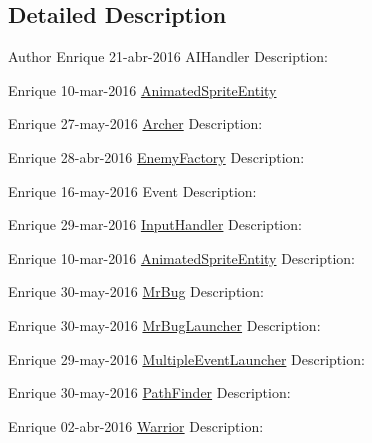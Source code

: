 \subsection{Detailed Description}
\begin{DoxyAuthor}{Author}
Enrique  21-\/abr-\/2016  A\+I\+Handler Description\+:

Enrique  10-\/mar-\/2016  \mbox{\hyperlink{classentities_1_1_animated_sprite_entity}{Animated\+Sprite\+Entity}}

Enrique  27-\/may-\/2016  \mbox{\hyperlink{classentities_1_1_archer}{Archer}} Description\+:

Enrique  28-\/abr-\/2016  \mbox{\hyperlink{classentities_1_1_enemy_factory}{Enemy\+Factory}} Description\+:

Enrique  16-\/may-\/2016  Event Description\+:

Enrique  29-\/mar-\/2016  \mbox{\hyperlink{classentities_1_1_input_handler}{Input\+Handler}} Description\+:

Enrique  10-\/mar-\/2016  \mbox{\hyperlink{classentities_1_1_animated_sprite_entity}{Animated\+Sprite\+Entity}} Description\+:

Enrique  30-\/may-\/2016  \mbox{\hyperlink{classentities_1_1_mr_bug}{Mr\+Bug}} Description\+:

Enrique  30-\/may-\/2016  \mbox{\hyperlink{classentities_1_1_mr_bug_launcher}{Mr\+Bug\+Launcher}} Description\+:

Enrique  29-\/may-\/2016  \mbox{\hyperlink{classentities_1_1_multiple_event_launcher}{Multiple\+Event\+Launcher}} Description\+:

Enrique  30-\/may-\/2016  \mbox{\hyperlink{classentities_1_1_path_finder}{Path\+Finder}} Description\+:

Enrique  02-\/abr-\/2016  \mbox{\hyperlink{classentities_1_1_warrior}{Warrior}} Description\+: 
\end{DoxyAuthor}
